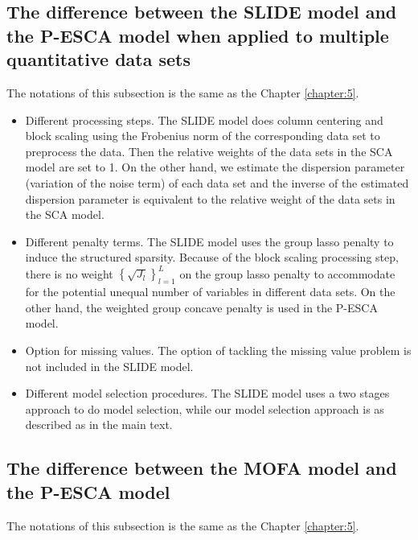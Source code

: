 \subsection{The difference between the SLIDE model and the P-ESCA model when applied to multiple quantitative data sets}
The notations of this subsection is the same as the Chapter \ref{chapter:5}.

\begin{itemize}
  \item Different processing steps. The SLIDE model does column centering and block scaling using the Frobenius norm of the corresponding data set to preprocess the data. Then the relative weights of the data sets in the SCA model are set to 1. On the other hand, we estimate the dispersion parameter (variation of the noise term) of each data set and the inverse of the estimated dispersion parameter is equivalent to the relative weight of the data sets in the SCA model.
  \item Different penalty terms. The SLIDE model uses the group lasso penalty to induce the structured sparsity. Because of the block scaling processing step, there is no weight $\left\{ \sqrt{J_l} \right\}_{l=1}^L$ on the group lasso penalty to accommodate for the potential unequal number of variables in different data sets. On the other hand, the weighted group concave penalty is used in the P-ESCA model.
  \item Option for missing values. The option of tackling the missing value problem is not included in the SLIDE model.
  \item Different model selection procedures. The SLIDE model uses a two stages approach to do model selection, while our model selection approach is as described as in the main text.
\end{itemize}

\subsection{The difference between the MOFA model and the P-ESCA model}
The notations of this subsection is the same as the Chapter \ref{chapter:5}.


